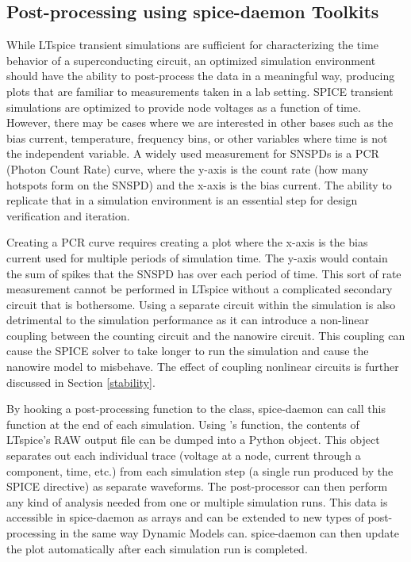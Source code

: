 \subsection{Post-processing using spice-daemon Toolkits}

While LTspice transient simulations are sufficient for characterizing the time behavior of a superconducting 
circuit, an optimized simulation environment should have the ability to post-process the data 
in a meaningful way, producing plots that are familiar to measurements taken in a lab setting.
SPICE transient simulations are optimized to provide
 node voltages as a function of time. However, there may be cases where we are interested in other bases such as the bias current, temperature, frequency bins, or other variables where time is not the independent variable. A widely used measurement for SNSPDs is a PCR (Photon Count Rate) curve, where
the y-axis is the count rate (how many hotspots form on the SNSPD) and the x-axis is the bias current. The ability to replicate that in a simulation environment is an essential step for
design verification and iteration.

Creating a PCR curve requires creating a plot where the x-axis is the bias current used for multiple
periods of simulation time. The y-axis would contain the sum of spikes that the SNSPD has over each period
of time. This sort of rate measurement cannot be performed in LTspice without a complicated secondary circuit
that is bothersome. Using a separate circuit within the simulation is also detrimental to the simulation
performance as it can introduce a non-linear coupling between the counting circuit and the nanowire circuit. 
This coupling can cause the SPICE solver to take longer to run the simulation and cause the nanowire model to
misbehave. The effect of coupling nonlinear circuits is further discussed in Section \ref{stability}.

By hooking a post-processing function to the  class, spice-daemon can call this 
function at the end of each simulation. Using 's 
function, the contents of LTspice's RAW output file can be dumped into a Python object. This object
separates out each individual trace (voltage at a node, current through a component, time, etc.)
from each simulation step (a single run produced by the  SPICE directive) as separate waveforms. The 
post-processor can then perform any kind of analysis needed from one or multiple simulation runs.
This data is accessible in spice-daemon as
 arrays and can be extended to new types of post-processing in the same way Dynamic Models can. spice-daemon can then update the plot automatically after each simulation run is completed.

